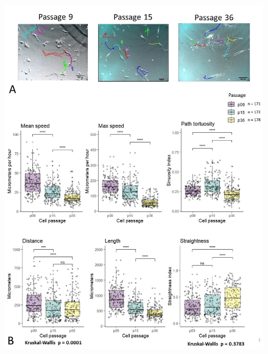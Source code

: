 \documentclass[alpha-refs]{wiley-article}
\begin{document}
\begin{figure}[hbt!]
  \includegraphics[width=1\linewidth]{traj.jpg}
  \caption{}
  \centering
\end{figure}
\end{document}
